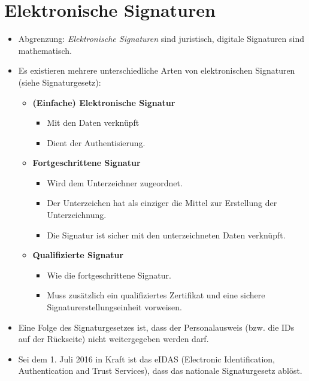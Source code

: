    \section{Elektronische Signaturen}
        \begin{itemize}
        	\item Abgrenzung: \textit{Elektronische Signaturen} sind juristisch, digitale Signaturen sind mathematisch.
        	\item Es existieren mehrere unterschiedliche Arten von elektronischen Signaturen (siehe Signaturgesetz):
	        	\begin{itemize}
	        		\item \textbf{(Einfache) Elektronische Signatur}
		        		\begin{itemize}
		        			\item Mit den Daten verknüpft
		        			\item Dient der Authentisierung.
		        		\end{itemize}
	        		\item \textbf{Fortgeschrittene Signatur}
		        		\begin{itemize}
		        			\item Wird dem Unterzeichner zugeordnet.
		        			\item Der Unterzeichen hat als einziger die Mittel zur Erstellung der Unterzeichnung.
		        			\item Die Signatur ist sicher mit den unterzeichneten Daten verknüpft.
		        		\end{itemize}
	        		\item \textbf{Qualifizierte Signatur}
		        		\begin{itemize}
		        			\item Wie die fortgeschrittene Signatur.
		        			\item Muss zusätzlich ein qualifiziertes Zertifikat und eine sichere Signaturerstellungseinheit vorweisen.
		        		\end{itemize}
	        	\end{itemize}
        	\item Eine Folge des Signaturgesetzes ist, dass der Personalausweis (bzw. die IDs auf der Rückseite) nicht weitergegeben werden darf.
        	\item Sei dem 1. Juli 2016 in Kraft ist das eIDAS (Electronic Identification, Authentication and Trust Services), dass das nationale Signaturgesetz ablöst.
	        	\begin{itemize}

\end{itemize}
\end{itemize}
